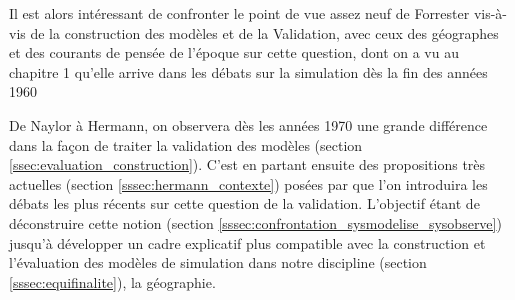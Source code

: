 Il est alors intéressant de confronter le point de vue assez neuf de Forrester vis-à-vis de la construction des modèles et de la Validation, avec ceux des géographes et des courants de pensée de l'époque sur cette question, dont on a vu au chapitre 1 qu'elle arrive dans les débats sur la simulation dès la fin des années 1960 \autocites{Naylor1967, Hermann1967, Dutton1971, Guetzkow1962, Guetzkow1972}

De Naylor à Hermann, on observera dès les années 1970 une grande différence dans la façon de traiter la validation des modèles (section \ref{ssec:evaluation_construction}). C'est en partant ensuite des propositions très actuelles (section \ref{sssec:hermann_contexte}) posées par \textcite{Hermann1967} que l'on introduira les débats les plus récents sur cette question de la validation. L'objectif étant de déconstruire cette notion (section \ref{sssec:confrontation_sysmodelise_sysobserve}) jusqu'à développer un cadre explicatif plus compatible avec la construction et l'évaluation des modèles de simulation dans notre discipline (section \ref{sssec:equifinalite}), la géographie.





